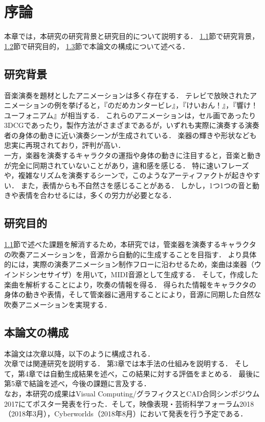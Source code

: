 \chapter{序論}
\label{chap:intro}

本章では，本研究の研究背景と研究目的について説明する．
\ref{sec:background}節で研究背景，
\ref{sec:purpose}節で研究目的，
\ref{sec:structure}節で本論文の構成について述べる．

\section{研究背景}\label{sec:background}
\indent
音楽演奏を題材としたアニメーションは多く存在する．
テレビで放映されたアニメーションの例を挙げると，『のだめカンタービレ』，『けいおん！』，『響け！ユーフォニアム』が相当する．
これらのアニメーションは，セル画であったり3DCGであったり，製作方法がさまざまであるが，いずれも実際に演奏する演奏者の身体の動きに近い演奏シーンが生成されている．
楽器の輝きや形状なども忠実に再現されており，評判が高い．\\
\indent
一方，楽器を演奏するキャラクタの運指や身体の動きに注目すると，音楽と動きが完全に同期されていないことがあり，違和感を感じる．
特に速いフレーズや，複雑なリズムを演奏するシーンで，このようなアーティファクトが起きやすい．
また，表情からも不自然さを感じることがある．
しかし，1つ1つの音と動きや表情を合わせるには，多くの労力が必要となる．

\section{研究目的}\label{sec:purpose}
\indent
\ref{sec:background}節で述べた課題を解消するため，本研究では，管楽器を演奏するキャラクタの吹奏アニメーションを，音源から自動的に生成することを目指す．
より具体的には，実際の演奏アニメーション制作フローに沿わせるため，楽曲は楽器（ウインドシンセサイザ）を用いて，MIDI音源として生成する．
そして，作成した楽曲を解析することにより，吹奏の情報を得る．
得られた情報をキャラクタの身体の動きや表情，そして管楽器に適用することにより，音源に同期した自然な吹奏アニメーションを実現する．

\section{本論文の構成}\label{sec:structure}
本論文は次章以降，以下のように構成される．\\
\indent
次章では関連研究を説明する．
第3章では本手法の仕組みを説明する．
そして，第4章では自動生成結果を述べ，この結果に対する評価をまとめる．
最後に第5章で結論を述べ，今後の課題に言及する．\\
\indent
なお，本研究の成果はVisual Computing/グラフィクスとCAD合同シンポジウム2017にてポスター発表\cite{vc}を行った．そして，映像表現・芸術科学フォーラム2018（2018年3月），Cyberworlds（2018年8月）において発表を行う予定である．
